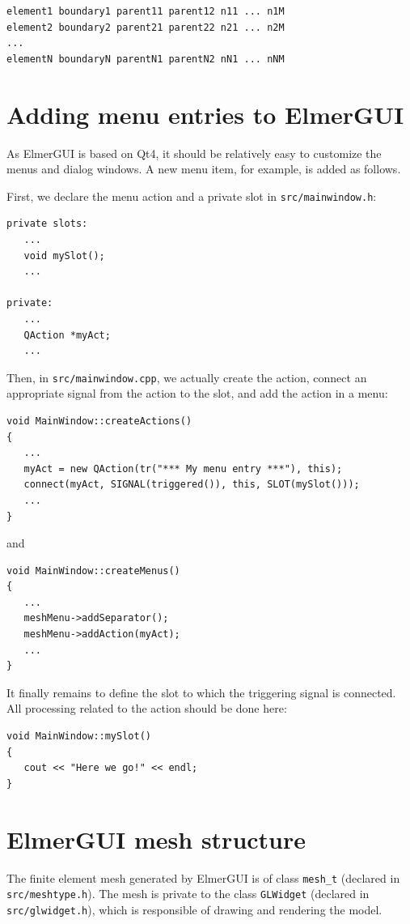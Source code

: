 \documentclass[a4paper,12pt]{article}
\begin{document}
\vskip5mm

\begin{verbatim}
element1 boundary1 parent11 parent12 n11 ... n1M
element2 boundary2 parent21 parent22 n21 ... n2M
...
elementN boundaryN parentN1 parentN2 nN1 ... nNM
\end{verbatim}

\newpage

\section{Adding menu entries to ElmerGUI}

As ElmerGUI is based on Qt4, it should be relatively easy to customize the menus
and dialog windows. A new menu item, for example, is added as follows.

First, we declare the menu action and a private slot in {\tt src/mainwindow.h}:
\begin{verbatim}
private slots:
   ...
   void mySlot();
   ...

private:
   ...
   QAction *myAct;
   ...
\end{verbatim}

Then, in {\tt src/mainwindow.cpp}, we actually create the action, connect
an appropriate signal from the action to the slot, and add the action in
a menu:
\begin{verbatim}
void MainWindow::createActions()
{
   ...
   myAct = new QAction(tr("*** My menu entry ***"), this);
   connect(myAct, SIGNAL(triggered()), this, SLOT(mySlot()));
   ...
}
\end{verbatim}
and
\begin{verbatim}
void MainWindow::createMenus()
{
   ...
   meshMenu->addSeparator();
   meshMenu->addAction(myAct);
   ...
}
\end{verbatim}

It finally remains to define the slot to which the triggering signal is connected.
All processing related to the action should be done here:
\begin{verbatim}
void MainWindow::mySlot()
{
   cout << "Here we go!" << endl;
}
\end{verbatim}

\newpage

\section{ElmerGUI mesh structure}

The finite element mesh generated by ElmerGUI is of class {\tt mesh\_t}
(declared in {\tt src/meshtype.h}). The mesh is private to the class {\tt GLWidget}
(declared in {\tt src/glwidget.h}), which is responsible of drawing and
rendering the model.
\end{document}
